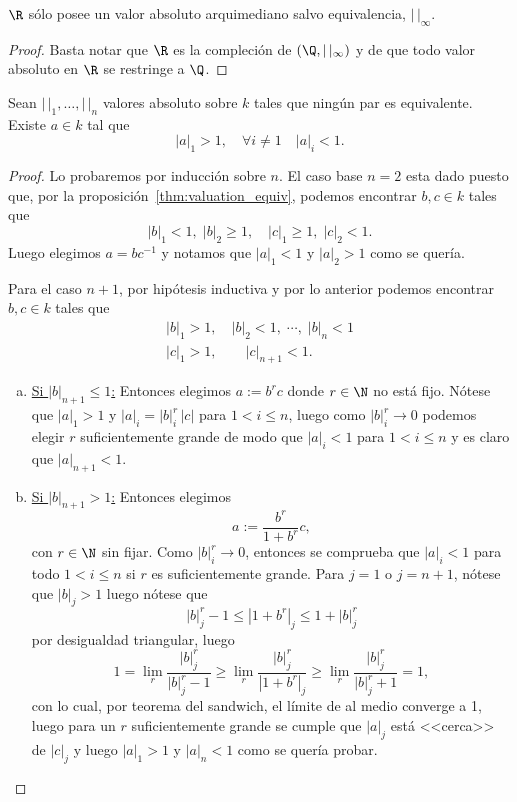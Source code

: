 \documentclass[teoria-numeros.tex]{subfiles}
\begin{document}
\begin{cor}
	$\R$ sólo posee un valor absoluto arquimediano salvo equivalencia, $| \, |_\infty$.
\end{cor}
\begin{proof}
	Basta notar que $\R$ es la compleción de $(\Q, |\,|_\infty)$ y de que todo valor absoluto en $\R$ se restringe a $\Q$.
\end{proof}

\begin{lem}
	Sean $|\,|_1, \dots, |\,|_n$ valores absoluto sobre $k$ tales que ningún par es equivalente.
	Existe $a \in k$ tal que
	$$ |a|_1 > 1, \quad \forall i\ne 1 \quad |a|_i < 1. $$
\end{lem}
\begin{proof}
	Lo probaremos por inducción sobre $n$.
	El caso base $n = 2$ esta dado puesto que, por la proposición~\ref{thm:valuation_equiv}, podemos encontrar $b, c \in k$ tales que
	$$ |b|_1 < 1, \; |b|_2 \ge 1, \quad |c|_1 \ge 1, \; |c|_2 < 1. $$
	Luego elegimos $a = bc^{-1}$ y notamos que $|a|_1 < 1$ y $|a|_2 > 1$ como se quería.

	Para el caso $n+1$, por hipótesis inductiva y por lo anterior podemos encontrar $b, c \in k$ tales que
	\begin{gather*}
		|b|_1 > 1, \quad |b|_2 < 1, \; \cdots, \; |b|_n < 1 \\
		|c|_1 > 1, \qquad |c|_{n+1} < 1.
	\end{gather*}
	\begin{enumerate}[(a)]
		\item \underline{Si $|b|_{n+1} \le 1$:}
			Entonces elegimos $a := b^r c$ donde $r \in \N$ no está fijo.
			Nótese que $|a|_1 > 1$ y $|a|_i = |b|_i^r \, |c|$ para $1 < i \le n$, luego como $|b|_i^r \to 0$ podemos elegir $r$ suficientemente grande
			de modo que $|a|_i < 1$ para $1 < i \le n$ y es claro que $|a|_{n+1} < 1$.

		\item \underline{Si $|b|_{n+1} > 1$:}
			Entonces elegimos
			$$ a := \frac{b^r}{1 + b^r}c, $$
			con $r \in \N$ sin fijar.
			Como $|b|_i^r \to 0$, entonces se comprueba que $|a|_i < 1$ para todo $1 < i \le n$ si $r$ es suficientemente grande.
			Para $j = 1$ o $j = n+1$, nótese que $|b|_j > 1$ luego nótese que
			$$ |b|_j^r - 1 \le |1 + b^r|_j \le 1 + |b|_j^r $$
			por desigualdad triangular, luego
			$$ 1 = \lim_r \frac{|b|_j^r}{|b|_j^r - 1} \ge \lim_r \frac{|b|_j^r}{|1 + b^r|_j} \ge \lim_r \frac{|b|_j^r}{|b|_j^r + 1} = 1, $$
			con lo cual, por teorema del sandwich, el límite de al medio converge a 1, luego para un $r$ suficientemente grande se cumple
			que $|a|_j$ está <<cerca>> de $|c|_j$ y luego $|a|_1 > 1$ y $|a|_n < 1$ como se quería probar. \qedhere
	\end{enumerate}
\end{proof}
\end{document}
